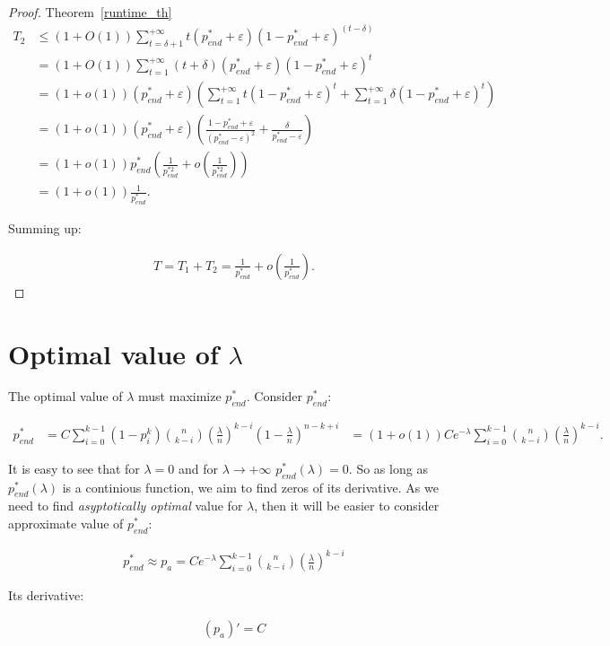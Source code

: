 \documentclass{article}
\begin{document}
\begin{proof}{Theorem~\ref{runtime_th}}
\begin{align*}
  T_2 &\le (1 + O(1)) \sum\limits_{t = \delta + 1}^{+\infty} t (p_{end}^* + \varepsilon) (1 - p_{end}^* + \varepsilon)^{(t - \delta)} \\
  &= (1 + O(1)) \sum\limits_{t = 1}^{+\infty} (t + \delta) (p_{end}^* + \varepsilon) (1 - p_{end}^* + \varepsilon)^t \\
  &= (1 + o(1)) (p_{end}^* + \varepsilon) \left(\sum\limits_{t = 1}^{+\infty} t (1 - p_{end}^* + \varepsilon)^t +  \sum\limits_{t = 1}^{+\infty} \delta (1 - p_{end}^* + \varepsilon)^t \right) \\
  &= (1 + o(1)) (p_{end}^* + \varepsilon) \left( \frac{1 - p_{end}^* + \varepsilon}{(p_{end}^* - \varepsilon)^2} + \frac{\delta}{p_{end}^* - \varepsilon}\right) \\
  &= (1 + o(1)) p_{end}^* \left( \frac{1}{p_{end}^{*2}} + o\left(\frac{1}{p_{end}^{*2}}\right)\right) \\
  &= (1 + o(1))  \frac{1}{p_{end}^*}.
\end{align*}

Summing up:

\begin{align*}
T = T_1 + T_2 = \frac{1}{p_{end}^*} + o\left(\frac{1}{p_{end}^*}\right).
\end{align*}

\end{proof}

\section{Optimal value of $\lambda$}

The optimal value of $\lambda$ must maximize $p_{end}^*$. Consider $p_{end}^*:$

\begin{align*}
p_{end}^* &= C\sum\limits_{i = 0}^{k - 1} (1 - p_i^k) \binom{n}{k - i} \left( \frac{\lambda}{n} \right)^{k - i}  \left(1 - \frac{\lambda}{n} \right)^{n - k + i}
&= (1 + o(1))Ce^{-\lambda}\sum\limits_{i = 0}^{k - 1} \binom{n}{k - i} \left( \frac{\lambda}{n} \right)^{k - i}.
\end{align*}

It is easy to see that for $\lambda = 0$ and for $\lambda \to +\infty$ $p_{end}^*(\lambda) = 0$. So as long as $p_{end}^*(\lambda)$ is a continious function, we aim to find zeros of its derivative. As we need to find \textit{asyptotically optimal} value for $\lambda$, then it will be easier to consider approximate value of $p_{end}^*:$

\begin{align*}
 p_{end}^*  \approx p_a = Ce^{-\lambda}\sum\limits_{i = 0}^{k - 1} \binom{n}{k - i} \left( \frac{\lambda}{n} \right)^{k - i}
\end{align*}

Its derivative:

\begin{align*}
(p_a)' = C
\end{align*}



\printbibliography
\end{document}
